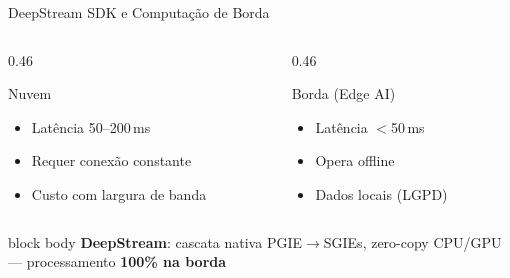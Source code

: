 \begin{frame}{DeepStream SDK e Computa\c{c}\~{a}o de Borda}
  \begin{columns}[T]
    \begin{column}{0.46\textwidth}
      {
      \begin{block}{\centering Nuvem}
        \begin{itemize}\scriptsize
          \item[\color{skipcolor}$\boldsymbol{\times}$] Lat\^{e}ncia 50--200\,ms
          \item[\color{skipcolor}$\boldsymbol{\times}$] Requer conex\~{a}o constante
          \item[\color{skipcolor}$\boldsymbol{\times}$] Custo com largura de banda
        \end{itemize}
      \end{block}
      }
    \end{column}
    \begin{column}{0.46\textwidth}
      {
      \begin{block}{\centering Borda (Edge AI)}
        \begin{itemize}\scriptsize
          \item[\color{headcolor}$\boldsymbol{\checkmark}$] Lat\^{e}ncia $<$50\,ms
          \item[\color{headcolor}$\boldsymbol{\checkmark}$] Opera offline
          \item[\color{headcolor}$\boldsymbol{\checkmark}$] Dados locais (LGPD)
        \end{itemize}
      \end{block}
      }
    \end{column}
  \end{columns}

  \vspace{2mm}

  \begin{beamercolorbox}[wd=\textwidth, rounded=true, shadow=false]{block body}
    \centering
    {\footnotesize\color{stagecolor}%
      \textbf{DeepStream}: cascata nativa PGIE$\to$SGIEs, zero-copy CPU/GPU --- processamento \textbf{100\% na borda}}
  \end{beamercolorbox}
\end{frame}
